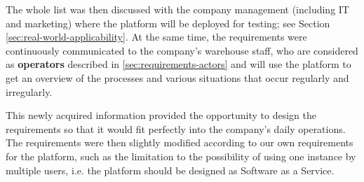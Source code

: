 The whole list was then discussed with the company management (including IT and marketing) where the platform will be deployed for testing; see Section \ref{sec:real-world-applicability}. 
At the same time, the requirements were continuously communicated to the company's warehouse staff, who are considered as \textbf{operators} described in \ref{sec:requirements-actors} and will use the platform to get an overview of the processes and various situations that occur regularly and irregularly.

This newly acquired information provided the opportunity to design the requirements so that it would fit perfectly into the company's daily operations. 
The requirements were then slightly modified according to our own requirements for the platform, such as the limitation to the possibility of using one instance by multiple users, i.e. the platform should be designed as Software as a Service.


